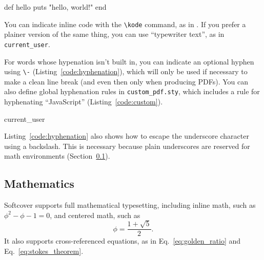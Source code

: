 \begin{codelisting}
\label{code:hello_world}
\begin{code}
def hello
  puts "hello, world!"
end
\end{code}
\end{codelisting}

You can indicate inline code with the \verb+\kode+ command, as in . If you prefer a plainer version of the same thing, you can use ``typewriter text'', as in \texttt{current\_\-user}.

For words whose hypenation isn't built in, you can indicate an optional hyphen using \verb+\-+ (Listing~\ref{code:hyphenation}), which will only be used if necessary to make a clean line break (and even then only when producing PDFs). You can also define global hyphenation rules in \texttt{custom\_pdf.sty}, which includes a rule for hyphenating ``JavaScript'' (Listing~\ref{code:custom}).

\begin{codelisting}
\label{code:hyphenation}
\begin{code}
current\_\-user
\end{code}
\end{codelisting}

\begin{codelisting}
\label{code:custom}
\end{codelisting}

Listing~\ref{code:hyphenation} also shows how to escape the underscore character using a backslash. This is necessary because plain underscores are reserved for math environments (Section~\ref{sec:mathematics}).

\subsection{Mathematics}
\label{sec:mathematics}

Softcover supports full mathematical typesetting, including inline math, such as $\phi^2 - \phi - 1 = 0$, and centered math, such as
\[ \phi = \frac{1+\sqrt{5}}{2}. \]
It also supports cross-referenced equations, as in Eq.~\eqref{eq:golden_ratio} and Eq.~\eqref{eq:stokes_theorem}.

